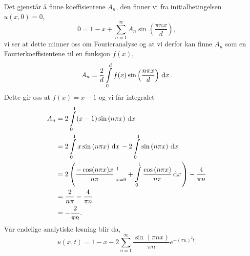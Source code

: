 \documentclass[norsk, 10pt]{article}
\newcommand{\dx}{\, {\rm d}x\, }
\def\para#1{\left( #1 \right)}
\begin{document}
Det gjenstår å finne koeffisientene $A_n$, den finner vi fra initialbetingelsen $u(x,0) = 0$,
$$ 0 = 1 - x + \sum\limits_{n=1}^{\infty} A_n\sin\para{\frac{\pi nx}{d}}, $$
vi ser at dette minner oss om Fourieranalyse og at vi derfor kan finne $A_n$ som en Fourierkoeffisientene til en funksjon $f(x)$,
$$ A_n = \frac{2}{d}\int\limits_0^d f(x)\sin\para{\frac{n\pi x}{d}}\dx. $$
Dette gir oss at $f(x) = x - 1$ og vi får integralet
\begin{align*}
A_n 	&= 2\int\limits_0^1 (x-1)\sin\para{n\pi x}\dx \\
	&= 2\int\limits_0^1x\sin\para{n\pi x}\dx - 2\int\limits_0^1\sin\para{n\pi x}\dx \\
	&= 2\para{ \frac{-\cos(n\pi x)x}{n\pi}\Big|_{x=0}^1 + \int\limits_0^1 \frac{\cos\para{n\pi x}}{n\pi}\dx} - \frac{4}{\pi n}\\
	&= \frac{2}{n\pi} - \frac{4}{\pi n} \\
	&= -\frac{2}{\pi n}.
\end{align*}
Vår endelige analytiske løsning blir da,
$$ u(x,t) = 1 - x - 2\sum\limits_{n=1}^{\infty}\frac{\sin\para{\pi nx}}{\pi n}e^{-(\pi n)^2 t}. $$

\end{document}
